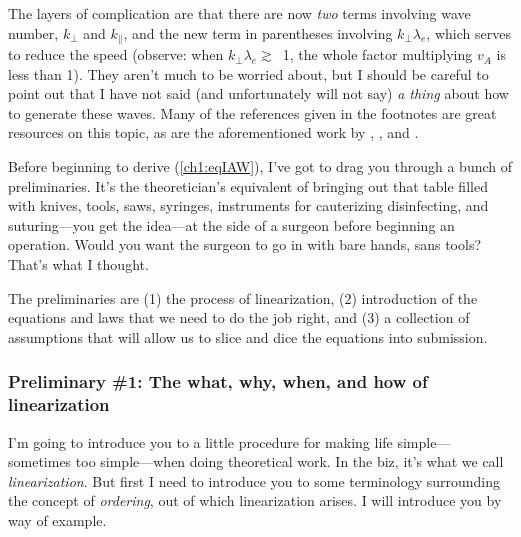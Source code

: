 The layers of complication are that there are now \emph{two} terms involving
wave number, $k_\perp$ and $k_\parallel$, and the new term in parentheses
involving $k_\perp \lambda_e$, which serves to reduce the \Alf speed (observe:
when $k_\perp \lambda_e \gtrsim$~1, the whole factor multiplying $v_A$ is less
than 1). They aren't much to be worried about, but I should be careful to point
out that I have not said (and unfortunately will not say) \emph{a thing} about
how to generate these waves. Many of the references given in the footnotes are
great resources on this topic, as are the aforementioned work by
\citet{Lysak1996}, \citet{Genot2004a}, and \citet{Morales1994}.

Before beginning to derive (\ref{ch1:eqIAW}), I've got to drag you through a
bunch of preliminaries. It's the theoretician's equivalent of bringing out that
table filled with knives, tools, saws, syringes, instruments for cauterizing
disinfecting, and suturing---you get the idea---at the side of a surgeon before
beginning an operation. Would you want the surgeon to go in with bare hands,
sans tools? That's what I thought.

The preliminaries are (1) the process of linearization, (2) introduction of the
equations and laws that we need to do the job right, and (3) a collection of
assumptions that will allow us to slice and dice the equations into submission.




\subsubsection{Preliminary \#1: The what, why, when, and how of linearization }

I'm going to introduce you to a little procedure for making life
simple---sometimes too simple---when doing theoretical work. In the biz, it's
what we call \emph{linearization}. But first I need to introduce you to some
terminology surrounding the concept of \emph{ordering}, out of which
linearization arises. I will introduce you by way of example.

